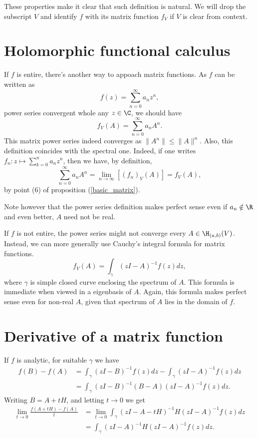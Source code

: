 These properties make it clear that such definition is natural. We will drop the subscript $V$ and identify $f$ with its matrix function $f_{V}$ if $V$ is clear from context.

\section{Holomorphic functional calculus}

If $f$ is entire, there's another way to appoach matrix functions. As $f$ can be written as
\[
	f(z) = \sum_{n = 0}^{\infty} a_{n} z^{n},
\]
power series convergent whole any $z \in \C$, we should have
\[
	f_{V}(A) = \sum_{n = 0}^{\infty} a_{n} A^{n}.
\]
This matrix power series indeed converges as $\|A^{n}\| \leq \|A\|^{n}$. Also, this definition coincides with the spectral one. Indeed, if one writes $f_{n} : z \mapsto  \sum_{k = 0}^{n} a_{n} z^{n}$, then we have, by definition,
\[
	\sum_{n = 0}^{\infty}a_{n} A^{n} = \lim_{n \to \infty} \left[(f_{n})_{V}(A) \right] = f_{V}(A),
\]
by point (6) of proposition (\ref{basic_matrix}).

Note however that the power series definition makes perfect sense even if $a_{n} \notin \R$ and even better, $A$ need not be real.

If $f$ is not entire, the power series might not converge every $A \in \H_{(a, b)}(V)$. Instead, we can more generally use Cauchy's integral formula for matrix functions.
\[
	f_{V}(A) = \int_{\gamma} (z I - A)^{-1} f(z) dz,
\]
where $\gamma$ is simple closed curve enclosing the spectrum of $A$. This formula is immediate when viewed in a eigenbasis of $A$. Again, this formula makes perfect sense even for non-real $A$, given that spectrum of $A$ lies in the domain of $f$.

\section{Derivative of a matrix function}

If $f$ is analytic, for suitable $\gamma$ we have
\begin{align*}
	f(B) - f(A) &= \int_{\gamma} (z I - B)^{-1} f(z) dz - \int_{\gamma} (z I - A)^{-1} f(z) dz \\
	&= \int_{\gamma} (z I - B)^{-1} (B - A) (z I - A)^{-1} f(z) dz.
\end{align*}
Writing $B = A + t H$, and letting $t \to 0$ we get
\begin{align*}
	\lim_{t \to 0} \frac{f(A + tH) - f(A)}{t} &= \lim_{t \to 0}\int_{\gamma} (z I - A - t H)^{-1} H (z I - A)^{-1} f(z) dz \\
	&= \int_{\gamma} (z I - A)^{-1} H (z I - A)^{-1} f(z) dz.
\end{align*}

